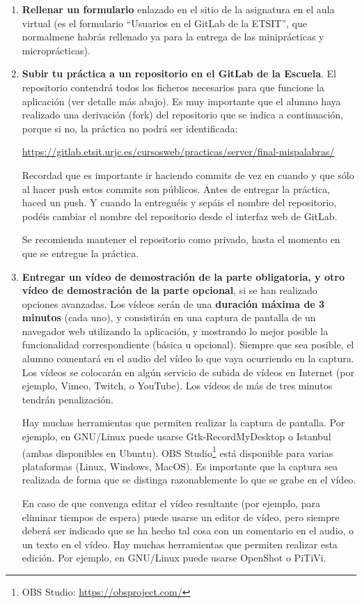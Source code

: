 \begin{enumerate}

  \item {\bf Rellenar un formulario} enlazado en el sitio de la asignatura en el aula virtual (es el formulario ``Usuarios en el GitLab de la ETSIT'', que normalmene habrás rellenado ya para la entrega de las miniprácticas y microprácticas).
  
  \item {\bf Subir tu práctica a un repositorio en el GitLab de la Escuela}. El repositorio contendrá todos los ficheros necesarios para que funcione la aplicación (ver detalle más abajo). Es muy importante que el alumno haya realizado una derivación (fork) del repositorio que se indica a continuación, porque si no, la práctica no podrá ser identificada: 

\url{https://gitlab.etsit.urjc.es/cursosweb/practicas/server/final-mispalabras/}

Recordad que es importante ir haciendo commits de vez en cuando y que sólo al hacer push estos commits son públicos. Antes de entregar la práctica, haced un push. Y cuando la entreguéis y sepáis el nombre del repositorio, podéis cambiar el nombre del repositorio desde el interfaz web de GitLab. 

Se recomienda mantener el repositorio como privado, hasta el momento en que se entregue la práctica.

 \item {\bf Entregar un vídeo de demostración de la parte obligatoria, y otro vídeo de demostración de la parte opcional}, si se han realizado opciones avanzadas. Los vídeos serán de una {\bf duración máxima de 3 minutos} (cada uno), y consistirán en una captura de pantalla de un navegador web utilizando la aplicación, y mostrando lo mejor posible la funcionalidad correspondiente (básica u opcional). Siempre que sea posible, el alumno comentará en el audio del vídeo lo que vaya ocurriendo en la captura. Los vídeos se colocarán en algún servicio de subida de vídeos en Internet (por ejemplo, Vimeo, Twitch, o YouTube). Los vídeos de más de tres minutos tendrán penalización.

Hay muchas herramientas que permiten realizar la captura de pantalla. Por ejemplo, en GNU/Linux puede usarse Gtk-RecordMyDesktop o Istanbul (ambas disponibles en Ubuntu). OBS Studio\footnote{OBS Studio: \url{https://obsproject.com/}} está disponible para varias plataformas (Linux, Windows, MacOS). Es importante que la captura sea realizada de forma que se distinga razonablemente lo que se grabe en el vídeo.

En caso de que convenga editar el vídeo resultante (por ejemplo, para eliminar tiempos de espera) puede usarse un editor de vídeo, pero siempre deberá ser indicado que se ha hecho tal cosa con un comentario en el audio, o un texto en el vídeo. Hay muchas herramientas que permiten realizar esta edición. Por ejemplo, en GNU/Linux puede usarse OpenShot o PiTiVi.

\end{enumerate}

